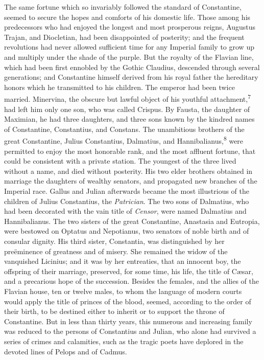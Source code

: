 The same fortune which so invariably followed the standard of
Constantine, seemed to secure the hopes and comforts of his
domestic life. Those among his predecessors who had enjoyed the
longest and most prosperous reigns, Augustus Trajan, and
Diocletian, had been disappointed of posterity; and the frequent
revolutions had never allowed sufficient time for any Imperial
family to grow up and multiply under the shade of the purple. But
the royalty of the Flavian line, which had been first ennobled by
the Gothic Claudius, descended through several generations; and
Constantine himself derived from his royal father the hereditary
honors which he transmitted to his children. The emperor had been
twice married. Minervina, the obscure but lawful object of his
youthful attachment,\textsuperscript{7} had left him only one son, who was called
Crispus. By Fausta, the daughter of Maximian, he had three
daughters, and three sons known by the kindred names of
Constantine, Constantius, and Constans. The unambitious brothers
of the great Constantine, Julius Constantius, Dalmatius, and
Hannibalianus,\textsuperscript{8} were permitted to enjoy the most honorable rank,
and the most affluent fortune, that could be consistent with a
private station. The youngest of the three lived without a name,
and died without posterity. His two elder brothers obtained in
marriage the daughters of wealthy senators, and propagated new
branches of the Imperial race. Gallus and Julian afterwards
became the most illustrious of the children of Julius
Constantius, the \textit{Patrician}. The two sons of Dalmatius, who had
been decorated with the vain title of \textit{Censor}, were named
Dalmatius and Hannibalianus. The two sisters of the great
Constantine, Anastasia and Eutropia, were bestowed on Optatus and
Nepotianus, two senators of noble birth and of consular dignity.
His third sister, Constantia, was distinguished by her
preëminence of greatness and of misery. She remained the widow of
the vanquished Licinius; and it was by her entreaties, that an
innocent boy, the offspring of their marriage, preserved, for
some time, his life, the title of Cæsar, and a precarious hope of
the succession. Besides the females, and the allies of the
Flavian house, ten or twelve males, to whom the language of
modern courts would apply the title of princes of the blood,
seemed, according to the order of their birth, to be destined
either to inherit or to support the throne of Constantine. But in
less than thirty years, this numerous and increasing family was
reduced to the persons of Constantius and Julian, who alone had
survived a series of crimes and calamities, such as the tragic
poets have deplored in the devoted lines of Pelops and of Cadmus.

